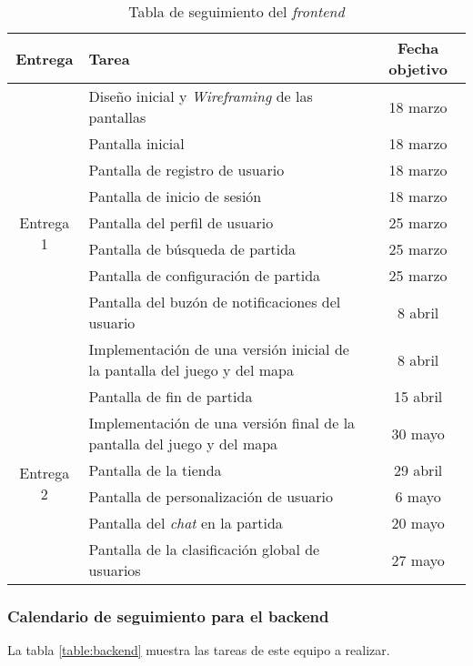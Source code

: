 \documentclass[11pt, a4paper, titlepage]{article}
\begin{document}
\renewcommand{\arraystretch}{1.3}
\begin{table}[hbt!]
\begin{adjustbox}{minipage=18cm, center}
\begin{tabularx}{\textwidth}{|c|X|c| }
\hline
Entrega & Tarea & Fecha objetivo\\ \hline
\multirow{9}{*}{Entrega 1} & Diseño inicial y \textit{Wireframing} de las pantallas & 18 marzo \\\cline{2-3}
& Pantalla inicial & 18 marzo\\\cline{2-3}
& Pantalla de registro de usuario & 18 marzo \\\cline{2-3}
& Pantalla de inicio de sesión &  18 marzo \\\cline{2-3}
& Pantalla del perfil de usuario &  25 marzo \\\cline{2-3}
& Pantalla de búsqueda de partida &  25 marzo \\\cline{2-3}
& Pantalla de configuración de partida & 25 marzo \\\cline{2-3}
& Pantalla del buzón de notificaciones del usuario &  8 abril \\\cline{2-3}
& Implementación de una versión inicial de la pantalla del juego y del mapa & 8 abril
\\\hline
\multirow{6}{*}{Entrega 2} & Pantalla de fin de partida & 15 abril \\\cline{2-3}
& Implementación de una versión final de la pantalla del juego y del mapa & 30 mayo\\\cline{2-3}
& Pantalla de la tienda & 29 abril \\\cline{2-3}
& Pantalla de personalización de usuario & 6 mayo\\\cline{2-3}
& Pantalla del \textit{chat} en la partida & 20 mayo \\\cline{2-3}
& Pantalla de la clasificación global de usuarios& 27 mayo \\\cline{2-3}
\hline
\end{tabularx}
\caption{Tabla de seguimiento del \textit{frontend}}
\label{table:frontend}
\end{adjustbox}
\end{table}
\FloatBarrier    

\newpage

\subsubsection{Calendario de seguimiento para el backend}
 La tabla \ref{table:backend} muestra las tareas de este equipo a realizar. \newline
\end{document}
